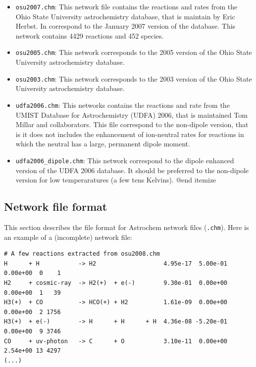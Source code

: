 \documentclass[a4paper,12pt]{article}
\begin{document}
{\begin{itemize}

\item \verb=osu2007.chm=: This network file contains the reactions and
  rates from the Ohio State University astrochemistry database, that
  is maintain by Eric Herbst. In correspond to the January 2007
  version of the database. This network contains 4429 reactions and
  452 species.

\item \verb=osu2005.chm=: This network corresponds to the 2005 version
  of the Ohio State University astrochemistry database.

\item \verb=osu2003.chm=: This network corresponds to the 2003 version
  of the Ohio State University astrochemistry database.

\item \verb=udfa2006.chm=: This networks contains the reactions and
  rate from the UMIST Database for Astrochemistry (UDFA) 2006, that is
  maintained Tom Millar and collaborators. This file correspond to the
  non-dipole version, that is it does not includes the enhancement of
  ion-neutral rates for reactions in which the neutral has a large,
  permanent dipole moment.

\item \verb=udfa2006_dipole.chm=: This network correspond to the
  dipole enhanced version of the UDFA 2006 database. It should be
  preferred to the non-dipole version for low temperaratures (a few
  tens Kelvins).  @end itemize

\end{itemize}

\subsection{Network file format}

This section describes the file format for Astrochem network files
(\verb=.chm=). Here is an example of a (incomplete) network file:

\begin{verbatim}
# A few reactions extracted from osu2008.chm
H      + H           -> H2                   4.95e-17  5.00e-01  0.00e+00  0    1
H2     + cosmic-ray  -> H2(+)  + e(-)        9.30e-01  0.00e+00  0.00e+00  1   39
H3(+)  + CO          -> HCO(+) + H2          1.61e-09  0.00e+00  0.00e+00  2 1756
H3(+)  + e(-)        -> H      + H      + H  4.36e-08 -5.20e-01  0.00e+00  9 3746
CO     + uv-photon   -> C      + O           3.10e-11  0.00e+00  2.54e+00 13 4297
(...)
\end{verbatim}

}
\end{document}
